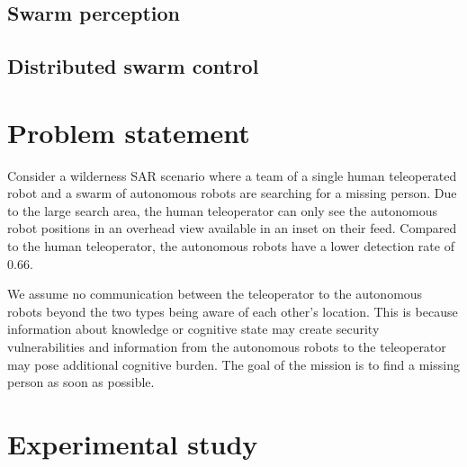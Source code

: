 \documentclass{article}
\begin{document}
\subsection{Swarm perception}



\subsection{Distributed swarm control}


\section{Problem statement}
Consider a wilderness SAR scenario where a team of a single human teleoperated robot and a swarm of autonomous robots are searching for a missing person. Due to the large search area, the human teleoperator can only see the autonomous robot positions in an overhead view available in an inset on their feed. Compared to the human teleoperator, the autonomous robots have a lower detection rate of 0.66. 

We assume no communication between the teleoperator to the autonomous robots beyond the two types being aware of each other's location. This is because information about knowledge or cognitive state may create security vulnerabilities \cite{} and information from the autonomous robots to the teleoperator may pose additional cognitive burden. The goal of the mission is to find a missing person as soon as possible.


\section{Experimental study}
\end{document}
